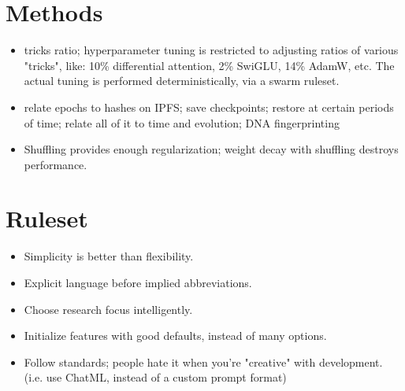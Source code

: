 \documentclass{article}
\begin{document}
\section{Methods}

\begin{itemize}
    \item tricks ratio; hyperparameter tuning is restricted to adjusting ratios of various "tricks", like: 10\% differential attention, 2\% SwiGLU, 14\% AdamW, etc. The actual tuning is performed deterministically, via a swarm ruleset.
    \item relate epochs to hashes on IPFS; save checkpoints; restore at certain periods of time; relate all of it to time and evolution; DNA fingerprinting
    \item Shuffling provides enough regularization; weight decay with shuffling destroys performance.
\end{itemize}

\section{Ruleset}

\begin{itemize}
    \item Simplicity is better than flexibility.
    \item Explicit language before implied abbreviations.
    \item Choose research focus intelligently.
    \item Initialize features with good defaults, instead of many options.
    \item Follow standards; people hate it when you're "creative" with development. (i.e. use ChatML, instead of a custom prompt format)
\end{itemize}



\end{document}
